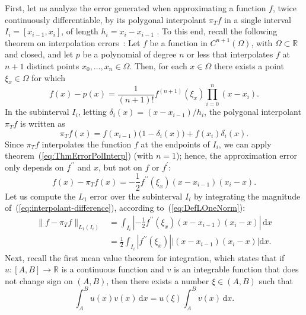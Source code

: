 \documentclass[a4paper,english]{IEEEtran}
\begin{document}
First, let us analyze the error generated when approximating a function
$f$, twice continuously differentiable, by its polygonal interpolant
${\pi_{T}} f$ in a single interval $I_{i}=[x_{i-1},x_{i}]$, of length
$h_{i}=x_{i}-x_{i-1}$ . To this end, recall the following theorem
on interpolation errors~\cite[sec. 4.2]{Cheney2012}: Let $f$ be
a function in $C^{n+1}(\Omega)$, with $\Omega\subset{\mathbb{R}}$ and closed,
and let $p$ be a polynomial of degree $n$ or less that interpolates
$f$ at $n+1$ distinct points $x_{0},\ldots,x_{n}\in\Omega$. Then,
for each $x\in\Omega$ there exists a point $\xi_{x}\in\Omega$ for
which 
\begin{equation}
{f}(x)-p(x)=\frac{1}{(n+1)!}{f}^{(n+1)}(\xi_{x})\prod_{i=0}^{n}(x-x_{i}).\label{eq:ThmErrorPolInterp}
\end{equation}
In the subinterval $I_{i}$, letting $\delta_{i}(x)=(x-x_{i-1})/h_{i}$,
the polygonal interpolant ${\pi_{T}} f$ is written as
\begin{equation}
{\pi_{T}}{f}(x)={f}(x_{i-1})\bigl(1-\delta_{i}(x)\bigr)+{f}(x_{i})\delta_{i}(x).\label{eq:LinearInterpolantInInterval}
\end{equation}
Since ${\pi_{T}}{f}$ interpolates the function ${f}$ at the endpoints of
$I_{i}$, we can apply theorem~(\ref{eq:ThmErrorPolInterp}) (with
$n=1$); hence, the approximation error only depends on ${{f}^{\prime\prime}}$ and
$x$, but not on ${f}$ or ${f}^{\prime}$:
\begin{equation}
{f}(x)-{\pi_{T}}{f}(x)=-\frac{1}{2}{{f}^{\prime\prime}}(\xi_{x})(x-x_{i-1})(x_{i}-x).\label{eq:interpolant-difference}
\end{equation}
Let us compute the ${L_{1}}$ error over the subinterval $I_{i}$ by
integrating the magnitude of~(\ref{eq:interpolant-difference}),
according to~(\ref{eq:DefLOneNorm}):
\begin{align*}
\|{f}-{\pi_{T}}{f}\|_{{L_{1}}(I_{i})} & =\int_{I_{i}}\left|-\frac{1}{2}{{f}^{\prime\prime}}(\xi_{x})(x-x_{i-1})(x_{i}-x)\right|\,{\mathrm{d}} x\\
 & =\frac{1}{2}\int_{I_{i}}\left|{{f}^{\prime\prime}}(\xi_{x})\right|\left|(x-x_{i-1})(x_{i}-x)\right|{\mathrm{d}} x.
\end{align*}
Next, recall the first mean value theorem for integration, which states
that if $u:[A,B]\rightarrow{\mathbb{R}}$ is a continuous function and $v$
is an integrable function that does not change sign on $(A,B)$, then
there exists a number $\xi\in(A,B)$ such that
\begin{equation}
\int_{A}^{B}u(x)v(x)\,{\mathrm{d}} x=u(\xi)\int_{A}^{B}v(x)\,{\mathrm{d}} x.\label{eq:FirstMVTIntegration}
\end{equation}
\end{document}
